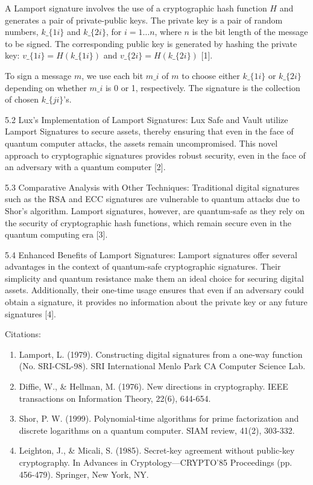 \documentclass[11pt]{article}
\begin{document}
A Lamport signature involves the use of a cryptographic hash function \(H\) and generates a pair of private-public keys. The private key is a pair of random numbers, \(k\_\{1i\}\) and \(k\_\{2i\}\), for \(i = 1 \ldots n\), where \(n\) is the bit length of the message to be signed. The corresponding public key is generated by hashing the private key: \(v\_\{1i\} = H(k\_\{1i\})\) and \(v\_\{2i\} = H(k\_\{2i\})\) [1].


To sign a message \(m\), we use each bit \(m\_i\) of \(m\) to choose either \(k\_\{1i\}\) or \(k\_\{2i\}\) depending on whether \(m\_i\) is 0 or 1, respectively. The signature is the collection of chosen \(k\_\{ji\}\)'s.


5.2 Lux's Implementation of Lamport Signatures: Lux Safe and Vault utilize Lamport Signatures to secure assets, thereby ensuring that even in the face of quantum computer attacks, the assets remain uncompromised. This novel approach to cryptographic signatures provides robust security, even in the face of an adversary with a quantum computer [2].


5.3 Comparative Analysis with Other Techniques: Traditional digital signatures such as the RSA and ECC signatures are vulnerable to quantum attacks due to Shor's algorithm. Lamport signatures, however, are quantum-safe as they rely on the security of cryptographic hash functions, which remain secure even in the quantum computing era [3].


5.4 Enhanced Benefits of Lamport Signatures: Lamport signatures offer several advantages in the context of quantum-safe cryptographic signatures. Their simplicity and quantum resistance make them an ideal choice for securing digital assets. Additionally, their one-time usage ensures that even if an adversary could obtain a signature, it provides no information about the private key or any future signatures [4].


Citations:

\begin{enumerate}
  \item Lamport, L. (1979). Constructing digital signatures from a one-way function (No. SRI-CSL-98). SRI International Menlo Park CA Computer Science Lab.
  \item Diffie, W., \& Hellman, M. (1976). New directions in cryptography. IEEE transactions on Information Theory, 22(6), 644-654.
  \item Shor, P. W. (1999). Polynomial-time algorithms for prime factorization and discrete logarithms on a quantum computer. SIAM review, 41(2), 303-332.
  \item Leighton, J., \& Micali, S. (1985). Secret-key agreement without public-key cryptography. In Advances in Cryptology---CRYPTO'85 Proceedings (pp. 456-479). Springer, New York, NY.
\end{enumerate}
\end{document}
